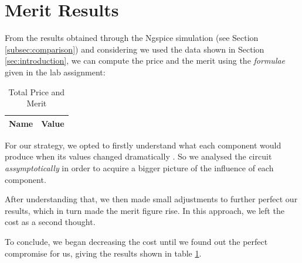 \section{Merit Results}
\label{sec:merit}

From the results obtained through the Ngspice simulation (see Section \ref{subsec:comparison}) and considering we used the data shown in Section \ref{sec:introduction}, we can compute the price and the merit using the \textit{formulae} given in the lab assignment:

\begin{table}[h]
    \centering
    \begin{tabular}{|l|c|}
    \hline
    {\bf Name} & {\bf Value} \\ \hline
    
    \end{tabular}
    \caption{Total Price and Merit}
    \label{tab:price_merit}
\end{table}

For our strategy, we opted to firstly understand what each component would produce when its values changed dramatically . So we analysed the circuit \textit{assymptotically} in order to acquire a bigger picture of the influence of each component.

After understanding that, we then made small adjustments to further perfect our results, which in turn made the merit figure rise. In this approach, we left the cost as a second thought.   

To conclude, we began decreasing the cost until we found out the perfect compromise for us, giving the results shown in table \ref{tab:price_merit}.


